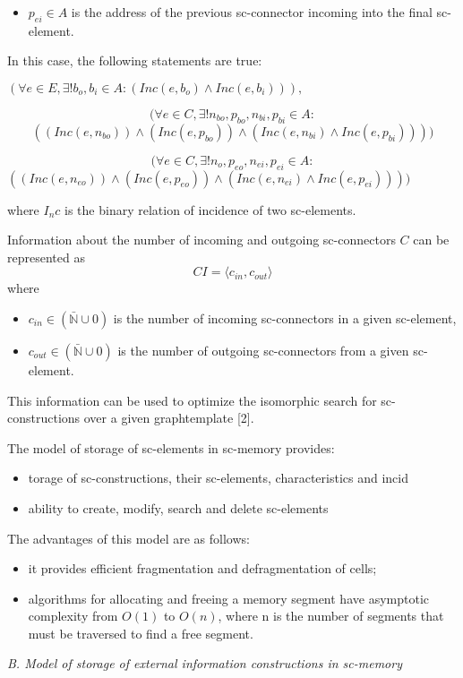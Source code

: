 \documentclass{scndocument}
\begin{document}
\begin{SCn}
\begin{multicols}{2}
\begin{itemize}
\item $p_{ei} \in A$ is the address of the previous sc-connector
incoming into the final sc-element.
\end{itemize}
In this case, the following statements are true:\par
 $(\forall e \in E, \exists ! b_o,b_i \in A : (Inc(e, b_o) \wedge Inc(e,b_i))),$ \par
\[(\forall e \in C, \exists ! n_{bo}, p_{bo}, n_{bi}, p_{bi} \in A :\] 
\[((Inc(e,n_{bo}))\wedge(Inc(e,p_{bo}))\wedge (Inc(e,n_{bi}) \wedge Inc(e,p_{bi}))))\] \par
\[(\forall e \in C, \exists ! n_{o}, 
p_{eo}, n_{ei}, p_{ei} \in A :\]
$((Inc(e,n_{eo}))\wedge(Inc(e,p_{eo}))\wedge (Inc(e,n_{ei}) \wedge Inc(e,p_{ei}))))$
\par where $I_nc$ is the binary relation of incidence of two
sc-elements.
\par Information about the number of incoming and outgoing sc-connectors $C$ can be represented as
\[CI = \langle c_{in}, c_{out}\rangle\]
where
\begin{itemize}
    \item $c_{in} \in (\bar{\mathbb{N}} \cup {0})$ is the number of incoming sc-connectors in a given sc-element,
    \item $c_{out} \in (\bar{\mathbb{N}} \cup {0})$ is the number of outgoing sc-connectors from a given sc-element.
\end{itemize}
\par This information can be used to optimize the isomorphic search for sc-constructions over a given graphtemplate [2].
\par The model of storage of sc-elements in sc-memory
provides:
\begin{itemize}
    \item torage of sc-constructions, their sc-elements, characteristics and incid
    \item ability to create, modify, search and delete sc-elements
\end{itemize}
The advantages of this model are as follows:
\begin{itemize}
\item it provides efficient fragmentation and defragmentation of cells;
\item algorithms for allocating and freeing a memory
segment have asymptotic complexity from $O(1)$ to
$O(n)$, where n is the number of segments that must
be traversed to find a free segment.
\end{itemize}
\textit{B. Model of storage of external information constructions in sc-memory} \par

\end{multicols}
\end{SCn}
\end{document}
